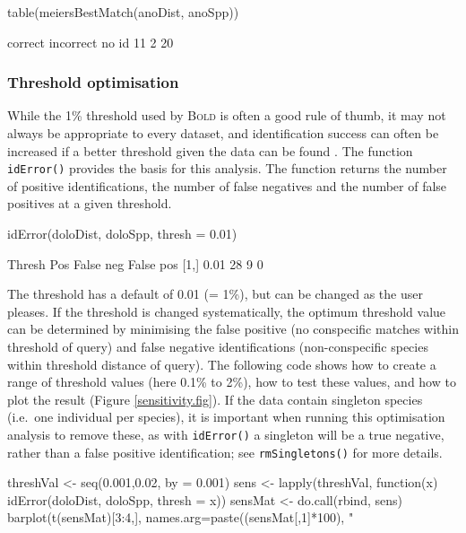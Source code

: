 \documentclass{article}
\newcommand{\progname}[1]{\textsc{#1}}
\newcommand{\fun}[1]{\texttt{#1}}
\begin{document}
\begin{console}
table(meiersBestMatch(anoDist, anoSpp))
\end{console}

\begin{Routput}
  correct incorrect     no id 
       11         2        20 
\end{Routput}


\subsubsection{Threshold optimisation}
While the 1\% threshold used by \progname{Bold} is often a good rule of thumb, it may not always be appropriate to every dataset, and identification success can often be increased if a better threshold given the data can be found  \citep{Meye.Paul.2005}.  The function \fun{idError()} provides the basis for this analysis. The function returns the number of positive identifications, the number of false negatives and the number of false positives at a given threshold. 

\begin{console}
idError(doloDist, doloSpp, thresh = 0.01)
\end{console}

\begin{Routput}
     Thresh Pos False neg False pos
[1,]   0.01  28         9         0
\end{Routput}

The threshold has a default of 0.01 (= 1\%), but can be changed as the user pleases. If the threshold is changed systematically, the optimum threshold value can be determined by minimising the false positive (no conspecific matches within threshold of query) and false negative identifications (non-conspecific species within threshold distance of query). The following code shows how to create a range of threshold values (here 0.1\% to 2\%), how to test these values, and how to plot the result (Figure \ref{sensitivity.fig}). If the data contain singleton species (i.e.\ one individual per species), it is important when running this optimisation analysis to remove these, as with \fun{idError()} a singleton will be a true negative, rather than a false positive identification; see \fun{rmSingletons()} for more details.

\begin{console}
threshVal <- seq(0.001,0.02, by = 0.001)
sens <- lapply(threshVal, function(x) idError(doloDist, doloSpp, thresh = x))
sensMat <- do.call(rbind, sens)
barplot(t(sensMat)[3:4,], names.arg=paste((sensMat[,1]*100), "%
\end{console}
\end{document}
